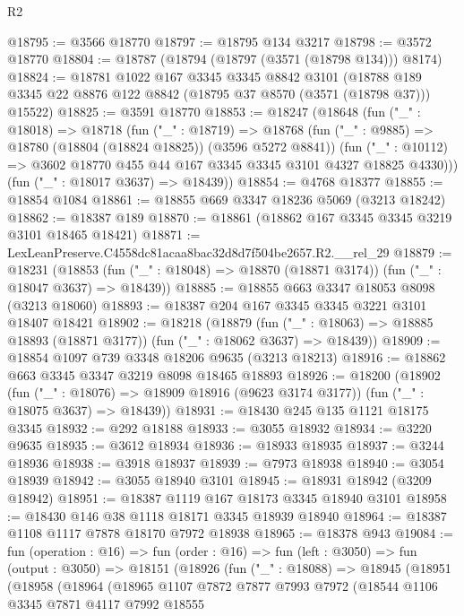 \begin{lexlean}{R2}
\begin{coremodule}
@18795 := @3566 @18770
@18797 := @18795 @134 @3217
@18798 := @3572 @18770
@18804 := @18787 (@18794 (@18797 (@3571 (@18798 @134))) @8174)
@18824 := @18781
    @1022
    @167
    @3345
    @3345
    @8842
    @3101
    (@18788 @189 @3345 @22 @8876 @122 @8842 (@18795 @37 @8570 (@3571 (@18798 @37))) @15522)
@18825 := @3591 @18770
@18853 := @18247
    (@18648
      (fun ("_" : @18018) =>
      @18718
        (fun ("_" : @18719) =>
        @18768
          (fun ("_" : @9885) => @18780 (@18804 (@18824 @18825)) (@3596 @5272 @8841))
          (fun ("_" : @10112) => @3602 @18770 @455 @44 @167 @3345 @3345 @3101 @4327 @18825 @4330)))
      (fun ("_" : @18017 @3637) => @18439))
@18854 := @4768 @18377
@18855 := @18854 @1084
@18861 := @18855 @669 @3347 @18236 @5069 (@3213 @18242)
@18862 := @18387 @189
@18870 := @18861 (@18862 @167 @3345 @3345 @3219 @3101 @18465 @18421)
@18871 := LexLeanPreserve.C4558dc81acaa8bac32d8d7f504be2657.R2.__rel_29
@18879 := @18231
    (@18853 (fun ("_" : @18048) => @18870 (@18871 @3174)) (fun ("_" : @18047 @3637) => @18439))
@18885 := @18855 @663 @3347 @18053 @8098 (@3213 @18060)
@18893 := @18387 @204 @167 @3345 @3345 @3221 @3101 @18407 @18421
@18902 := @18218
    (@18879
      (fun ("_" : @18063) => @18885 @18893 (@18871 @3177))
      (fun ("_" : @18062 @3637) => @18439))
@18909 := @18854 @1097 @739 @3348 @18206 @9635 (@3213 @18213)
@18916 := @18862 @663 @3345 @3347 @3219 @8098 @18465 @18893
@18926 := @18200
    (@18902
      (fun ("_" : @18076) => @18909 @18916 (@9623 @3174 @3177))
      (fun ("_" : @18075 @3637) => @18439))
@18931 := @18430 @245 @135 @1121 @18175 @3345
@18932 := @292 @18188
@18933 := @3055 @18932
@18934 := @3220 @9635
@18935 := @3612 @18934
@18936 := @18933 @18935
@18937 := @3244 @18936
@18938 := @3918 @18937
@18939 := @7973 @18938
@18940 := @3054 @18939
@18942 := @3055 @18940 @3101
@18945 := @18931 @18942 (@3209 @18942)
@18951 := @18387 @1119 @167 @18173 @3345 @18940 @3101
@18958 := @18430 @146 @38 @1118 @18171 @3345 @18939 @18940
@18964 := @18387 @1108 @1117 @7878 @18170 @7972 @18938
@18965 := @18378 @943
@19084 := fun (operation : @16) =>
  fun (order : @16) =>
  fun (left : @3050) =>
  fun (output : @3050) =>
  @18151
    (@18926
      (fun ("_" : @18088) =>
      @18945
        (@18951
          (@18958
            (@18964
              (@18965
                @1107
                @7872
                @7877
                @7993
                @7972
                (@18544
                  @1106
                  @3345
                  @7871
                  @4117
                  @7992
                  @18555

\end{coremodule}
\end{lexlean}
